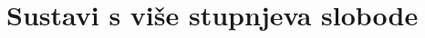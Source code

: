 \documentclass{rgn}
\begin{document}
    \chapter{Sustavi s više stupnjeva slobode}
        
        
        
        
        
\end{document}

